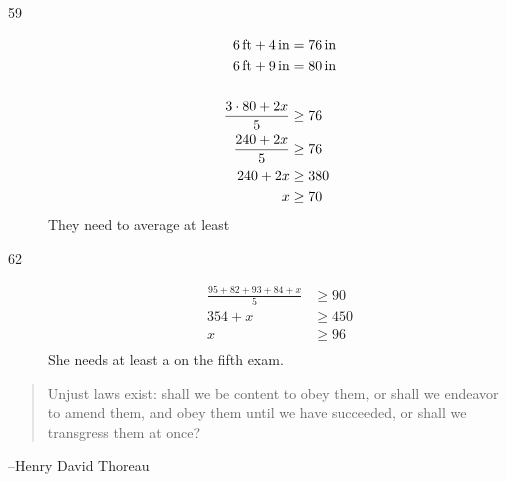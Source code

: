 \documentclass[letterpaper, landscape]{exam}
\begin{document}
\begin{description}
      \item[59]
        \begin{align*}
          \unit[6]{ft} + \unit[4]{in} &= \unit[76]{in} \\
          \unit[6]{ft} + \unit[9]{in} &= \unit[80]{in} \\
          \\
          \frac{3 \cdot 80 + 2x}{5} & \geq 76 \\
          \frac{240 + 2x}{5}        & \geq 76 \\
          240 + 2x                  & \geq 380 \\
          x                         & \geq 70 \\
        \end{align*}
        They need to average at least 

      \item[62]
        \begin{align*}
          \frac{95 + 82 + 93 + 84 + x}{5} & \geq 90 \\
          354 + x                         & \geq 450 \\
          x                               & \geq 96 \\
        \end{align*}
        She needs at least a  on the fifth exam.
        
    \end{description}

  \fi

  \ifprintanswers{}
  \else
    \vspace{4 cm}
    \begin{quote}
      \begin{em}
        Unjust laws exist: shall we be content to obey them, or shall we endeavor
        to amend them, and obey them until we have succeeded, or shall we
        transgress them at once?
      \end{em}
    \end{quote}
    \hspace{1 cm} --Henry David Thoreau
    
  \fi
\end{document}
